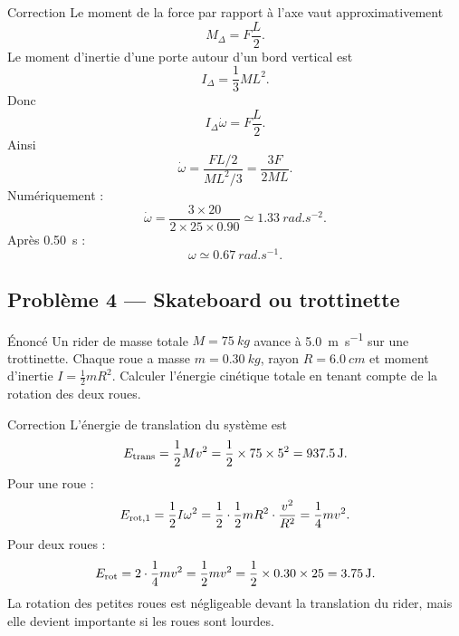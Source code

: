 \documentclass[11pt,a4paper]{article}
\begin{document}
\begin{center}
\end{center}

\begin{correctionbox}{Correction}{}
Le moment de la force par rapport à l'axe vaut approximativement
\[
M_\Delta=F\frac L2.
\]
Le moment d'inertie d'une porte autour d'un bord vertical est
\[
I_\Delta=\frac13ML^2.
\]
Donc
\[
I_\Delta\dot\omega=F\frac L2.
\]
Ainsi
\[
\dot\omega=\frac{FL/2}{ML^2/3}
=\frac{3F}{2ML}.
\]
Numériquement :
\[
\dot\omega=\frac{3\times20}{2\times25\times0.90}
\simeq \SI{1.33}{rad.s^{-2}}.
\]
Après \SI{0.50}{s} :
\[
\omega\simeq \SI{0.67}{rad.s^{-1}}.
\]
\end{correctionbox}

\subsection{Problème 4 — Skateboard ou trottinette}

\begin{exercisebox}{Énoncé}{}
Un rider de masse totale $M=\SI{75}{kg}$ avance à \SI{5.0}{m.s^{-1}} sur une trottinette.
Chaque roue a masse $m=\SI{0.30}{kg}$, rayon $R=\SI{6.0}{cm}$ et moment d'inertie $I=\frac12mR^2$.
Calculer l'énergie cinétique totale en tenant compte de la rotation des deux roues.
\end{exercisebox}

\begin{correctionbox}{Correction}{}
L'énergie de translation du système est
\[
E_{\rm trans}=\frac12Mv^2
=
\frac12\times75\times5^2
=\SI{937.5}{J}.
\]
Pour une roue :
\[
E_{\rm rot,1}=\frac12I\omega^2
=\frac12\cdot\frac12mR^2\cdot\frac{v^2}{R^2}
=\frac14mv^2.
\]
Pour deux roues :
\[
E_{\rm rot}=2\cdot\frac14mv^2
=\frac12mv^2
=\frac12\times0.30\times25
=\SI{3.75}{J}.
\]
La rotation des petites roues est négligeable devant la translation du rider, mais elle devient importante si les roues sont lourdes.
\end{correctionbox}

\end{document}
